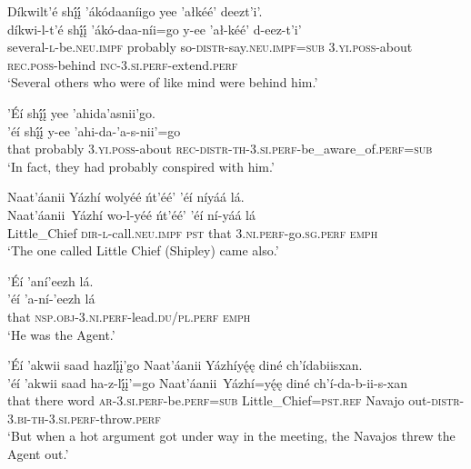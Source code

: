 \ea\label{ex:text3-3-4}
Díkwilt’é shį́į́ ’ákódaaníigo yee ’ałkéé’ deezt’i’.\\
\gll díkwi-l-t’é shį́į́	’ákó-daa-níi=go	y-ee	’ał-kéé’	d-eez-t’i’\\
     several-\textsc{l}-be.\textsc{neu}.\textsc{impf} probably	so-\textsc{distr}-say.\textsc{neu}.\textsc{impf}=\textsc{sub}	3.\textsc{yi}.\textsc{poss}-about	\textsc{rec}.\textsc{poss}-behind	\textsc{inc}-3.\textsc{si}.\textsc{perf}-extend.\textsc{perf}\\
\glt `Several others who were of like mind were behind him.'
\z

\ea\label{ex:text3-3-5}
’Éí shį́į́ yee ’ahida’asnii’go.\\
\gll ’éí	shį́į́	y-ee	’ahi-da-’a-s-nii’=go\\
     that	probably	3.\textsc{yi}.\textsc{poss}-about	\textsc{rec}-\textsc{distr}-\textsc{th}-3.\textsc{si}.\textsc{perf}-be\_aware\_of.\textsc{perf}=\textsc{sub}\\
\glt `In fact, they had probably conspired with him.'
\z

\ea\label{ex:text3-4-1}
Naat’áanii Yázhí wolyéé ńt’éé’ ’éí níyáá lá.\\
\gll Naat’áanii~{Yázhí}	wo-l-yéé	ńt’éé’	’éí	ní-yáá	lá\\
     Little\_Chief	\textsc{dir}-\textsc{l}-call.\textsc{neu}.\textsc{impf}	\textsc{pst}	that	3.\textsc{ni}.\textsc{perf}-go.\textsc{sg}.\textsc{perf}	\textsc{emph}\\
\glt `The one called Little Chief (Shipley) came also.'
\z

\ea\label{ex:text3-4-2}
’Éí ’aní’eezh lá.\\
\gll ’éí	’a-ní-’eezh	lá\\
     that	\textsc{nsp}.\textsc{obj}-3.\textsc{ni}.\textsc{perf}-lead.\textsc{du}/\textsc{pl}.\textsc{perf}	\textsc{emph}\\
\glt `He was the Agent.'
\z

\ea\label{ex:text3-4-3}
’Éí ’akwii saad hazlį́į’go Naat’áanii Yázhíyę́ę diné ch’ídabiisxan.\\
\gll ’éí	’akwii	saad	ha-z-lį́į’=go	Naat’áanii~{Yázhí=yę́ę}	diné	ch’í-da-b-ii-s-xan\\
     that	there	word	\textsc{ar}-3.\textsc{si}.\textsc{perf}-be.\textsc{perf}=\textsc{sub}	Little\_Chief=\textsc{pst}.\textsc{ref}	Navajo	out-\textsc{distr}-3.\textsc{bi}-\textsc{th}-3.\textsc{si}.\textsc{perf}-throw.\textsc{perf}\\
\glt `But when a hot argument got under way in the meeting, the Navajos threw the Agent out.'
\z


